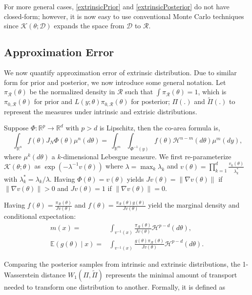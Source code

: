 \documentclass[10pt]{article}
\newcommand{\mc}[1]{\mathcal{#1}}
\DeclareMathOperator{\1}{\mathbbm{1}}
\begin{document}
For more general cases, \eqref{extrinsicPrior} and \eqref{extrinsicPosterior} do not have closed-form; however, it is now easy to use conventional Monte Carlo techniques since $\mc K(\theta;\mc D)$ expands the space from $\mc D$ to $\mc R$.

\subsection{Approximation Error}
We now quantify approximation error of extrinsic distribution. Due to similar form for prior and posterior, we now introduce some general notation. Let $\pi_{\mc R}(\theta)$ be the normalized density in $\mc R$ such that $\int \pi_{\mc R}(\theta)=1$, which is $\pi_{0,\mc R}(\theta)$ for prior and $L(y;\theta)\pi_{0,\mc R}(\theta)$ for posterior; $\Pi(.)$ and $\tilde\Pi(.)$ to represent the measures under intrinsic and extrisic distributions. 

Suppose $\Phi:\mathbb R^p \rightarrow \mathbb R^d$ with $p>d$ is Lipschitz, then the co-area formula \citep{federer2014geometric} is,
	\begin{equation}
\ \int_{\mathbb{R}^n}  f(\theta)J_N\Phi(\theta)\mu^n(d \theta)
	=\ \int_{\mathbb{R}^m}  \int_{\Phi^{-1}(y)}f(\theta) \mc H^{n-m}(d\theta)\mu^m(d y),
	\end{equation}
where $\mu^k(d\theta)$ a $k$-dimensional Lebesgue measure. We first re-parameterize $\mc K(\theta;\theta)$ as $\exp(-\lambda^{-1}  v(\theta))$ where $\lambda=\max_k \lambda_k$ and $v(\theta)=\prod_{k=1}^d\frac{v_k(\theta)}{\lambda^*_k}$ with $\lambda^*_k=\lambda_k/\lambda$. Having $\Phi(\theta)=v(\theta)$ yields $J v(\theta)=\|\nabla v(\theta)\|$ if $\|\nabla v(\theta)\|>0$ and $J v(\theta)=1$ if $\|\nabla v(\theta)\|=0$.

Having $f(\theta)=\frac{\pi_{\mc R}(\theta)}{J v(\theta)}$ and $f(\theta)=\frac{\pi_{\mc R}(\theta)g(\theta)}{J v(\theta)}$ yield the marginal density and conditional expectation:
\begin{equation}
	\begin{aligned}
m(x)= & \int_{v^{-1}(x)} \frac{ \pi_{\mc R}(\theta) }{ J v(\theta) } \mathcal{H}^{p-d}(d \theta),\\
\mathbb{E}(g(\theta) \mid x)= & \int_{v^{-1}(x)} \frac{ g(\theta) \pi_{\mc R}(\theta)}{ J v(\theta) } \mathcal{H}^{p-d}(d \theta).
		\end{aligned}
\end{equation}

Comparing the posterior samples from intrinsic and extrinsic distributions, the 1-Wasserstein distance $W_1(\Pi,\tilde\Pi)$ represents the minimal amount of transport needed to transform one distribution to another. Formally, it is defined as
\end{document}
